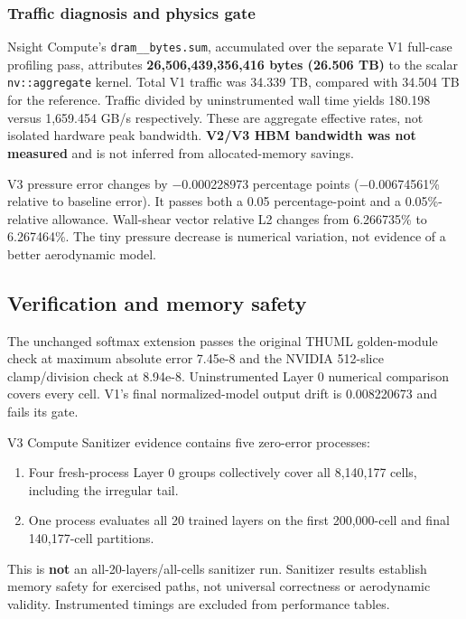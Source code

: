\documentclass[
  10pt,
]{article}
\providecommand{\tightlist}{%
  \setlength{\itemsep}{0pt}\setlength{\parskip}{0pt}}
\begin{document}
\subsubsection{Traffic diagnosis and physics
gate}\label{traffic-diagnosis-and-physics-gate}

Nsight Compute's \texttt{dram\_\_bytes.sum}, accumulated over the
separate V1 full-case profiling pass, attributes
\textbf{26,506,439,356,416 bytes (26.506 TB)} to the scalar
\texttt{nv::aggregate} kernel. Total V1 traffic was 34.339 TB, compared
with 34.504 TB for the reference. Traffic divided by uninstrumented wall
time yields 180.198 versus 1,659.454 GB/s respectively. These are
aggregate effective rates, not isolated hardware peak bandwidth.
\textbf{V2/V3 HBM bandwidth was not measured} and is not inferred from
allocated-memory savings.

V3 pressure error changes by −0.000228973 percentage points
(−0.00674561\% relative to baseline error). It passes both a 0.05
percentage-point and a 0.05\%-relative allowance. Wall-shear vector
relative L2 changes from 6.266735\% to 6.267464\%. The tiny pressure
decrease is numerical variation, not evidence of a better aerodynamic
model.

\subsection{Verification and memory
safety}\label{verification-and-memory-safety}

The unchanged softmax extension passes the original THUML golden-module
check at maximum absolute error 7.45e-8 and the NVIDIA 512-slice
clamp/division check at 8.94e-8. Uninstrumented Layer 0 numerical
comparison covers every cell. V1's final normalized-model output drift
is 0.008220673 and fails its gate.

V3 Compute Sanitizer evidence contains five zero-error processes:

\begin{enumerate}
\def\labelenumi{\arabic{enumi}.}
\tightlist
\item
  Four fresh-process Layer 0 groups collectively cover all 8,140,177
  cells, including the irregular tail.
\item
  One process evaluates all 20 trained layers on the first 200,000-cell
  and final 140,177-cell partitions.
\end{enumerate}

This is \textbf{not} an all-20-layers/all-cells sanitizer run. Sanitizer
results establish memory safety for exercised paths, not universal
correctness or aerodynamic validity. Instrumented timings are excluded
from performance tables.
\end{document}
